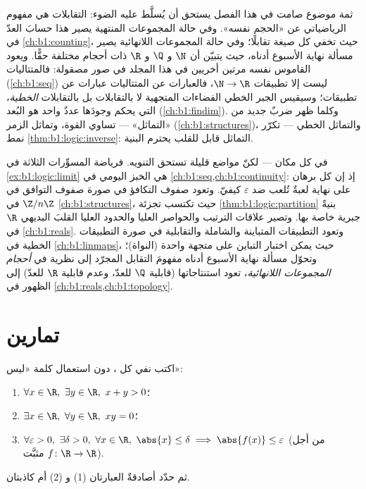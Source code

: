\begin{remark}\label{rem:b1:logic:interlude}
ثمة موضوع صامت في هذا الفصل يستحق أن يُسلَّط عليه الضوء:
التقابلات هي مفهوم الرياضياتي عن «الحجم نفسه». وفي حالة
المجموعات المنتهية يصير هذا حسابَ العدّ في \cref{ch:b1:counting}،
حيث تخفي كل صيغة تقابلًا؛ وفي حالة المجموعات اللانهائية يصير
مسألة نهاية الأسبوع أدناه، حيث يتبيّن أن $\N$ و $\Q$ و $\R$ ذات
أحجام مختلفة حقًّا. ويعود القاموس نفسه مرتين أخريين في هذا
المجلد في صور مصقولة: فالمتتاليات (\cref{ch:b1:seq}) ليست
إلا تطبيقات $\N \to \R$، فالعبارات عن المتتاليات عبارات عن
 تطبيقات؛ وسيقيس الجبر الخطي الفضاءات المتجهية لا
بالتقابلات بل بالتقابلات \emph{الخطية}، التي يحكم وجودَها عددٌ
واحد هو البُعد (\cref{ch:b1:findim}). وكلما ظهر ضربٌ جديد
من «التماثل» --- تساوي القوة، وتماثل الزمر
(\cref{ch:b1:structures})، والتماثل الخطي --- تكرّر نمط
\cref{thm:b1:logic:inverse}: التماثل  قابل للقلب يحترم البنية.
\end{remark}

\begin{remark}\label{rem:b1:logic:whereused}
في كل مكان --- لكنّ مواضع قليلة تستحق التنويه. فرياضة المسوِّرات
الثلاثة في \cref{ex:b1:logic:limit} هي الخبز اليومي في
\cref{ch:b1:seq,ch:b1:continuity}: إذ إن كل برهان على نهاية لعبةٌ تُلعب
ضد $\varepsilon$ كيفيّ. وتعود صفوف التكافؤ في صورة صفوف التوافق
في $\Z/n\Z$ في \cref{ch:b1:structures}، حيث تكتسب تجزئة
\cref{thm:b1:logic:partition} بنيةً جبرية خاصة بها. وتصير علاقات
الترتيب والحواصر العليا والحدود العليا القلبَ البديهي  $\R$ في
\cref{ch:b1:reals}.
وتعود التطبيقات المتباينة والشاملة والتقابلية في صورة التطبيقات
الخطية في \cref{ch:b1:linmaps}، حيث يمكن اختبار التباين على
متجهة واحدة (النواة)؛ وتحوّل مسألة نهاية الأسبوع أدناه مفهومَ
التقابل المجرّد إلى نظرية في \emph{أحجام المجموعات اللانهائية}،
تعود استنتاجاتها (قابلية $\Q$ للعدّ، وعدم قابلية $\R$ للعدّ) إلى
الظهور في \cref{ch:b1:reals,ch:b1:topology}.
\end{remark}

\section{تمارين}

\begin{exercise}[$\star$]\label{exo:b1:logic:1}
اكتب نفي كل ، دون استعمال كلمة «ليس»:
\begin{enumerate}
  \item $\forall x \in \R,\ \exists y \in \R,\ x + y > 0$؛
  \item $\exists x \in \R,\ \forall y \in \R,\ xy = 0$؛
  \item $\forall \varepsilon > 0,\ \exists \delta > 0,\ \forall x \in
        \R,\ \abs{x} \leq \delta \implies \abs{f(x)} \leq \varepsilon$
        (من أجل  $f \colon \R \to \R$ مثبَّت).
\end{enumerate}
ثم حدّد أصادقةٌ العبارتان (1) و (2) أم كاذبتان.
\end{exercise}

